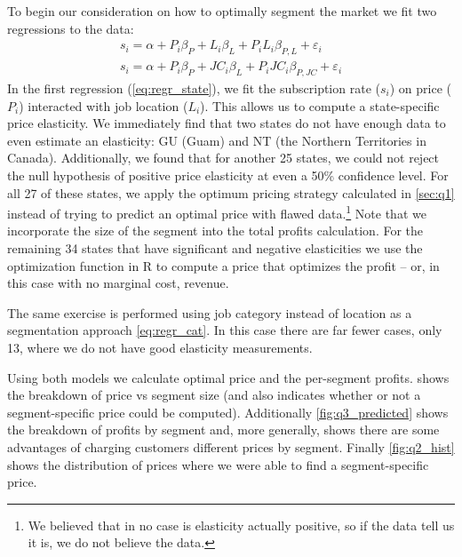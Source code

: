 \section{} %
To begin our consideration on how to optimally segment the market we fit two regressions to the data:
\begin{align}
s_i = \alpha +  P_i \beta_P + L_i \beta_L + P_i L_i \beta_{P,L} + \varepsilon_i \label{eq:regr_state} \\
s_i = \alpha +  P_i \beta_P + JC_i \beta_L + P_i JC_i \beta_{P,JC} + \varepsilon_i \label{eq:regr_cat}
\end{align}
In the first regression (\vref{eq:regr_state}), we fit the subscription rate ($s_i$) on price ($P_i$) interacted with job location ($L_i$). This allows us to compute a state-specific price elasticity. We immediately find that two states do not have enough data to even estimate an elasticity: GU (Guam) and NT (the Northern Territories in Canada).  Additionally, we found that for another 25 states, we could not reject the null hypothesis of positive price elasticity at even a 50\% confidence level. For all 27 of these states, we apply the optimum pricing strategy calculated in \cref{sec:q1} instead of trying to predict an optimal price with flawed data.\footnote{We believed that in no case is elasticity actually positive, so if the data tell us it is, we do not believe the data.} Note that we incorporate the size of the segment into the total profits calculation.  For the remaining 34 states that have significant and negative elasticities we use the optimization function in R to compute a price that optimizes the profit -- or, in this case with no marginal cost, revenue.

The same exercise is performed using job category instead of location as a segmentation approach \vref{eq:regr_cat}.  In this case there are far fewer cases, only 13, where we do not have good elasticity measurements.

Using both models we calculate optimal price and the per-segment profits.   shows the breakdown of price vs segment size (and also indicates whether or not a segment-specific price could be computed).  Additionally \vref{fig:q3_predicted} shows the breakdown of profits by segment and, more generally, shows there are some advantages of charging customers different prices by segment.  Finally \vref{fig:q2_hist} shows the distribution of prices where we were able to find a segment-specific price.


